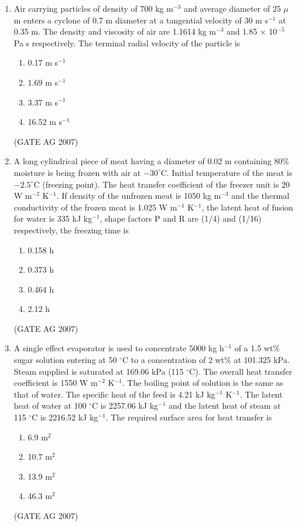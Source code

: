 \documentclass[journal,12pt,onecolumn]{IEEEtran}
\theoremstyle{remark}
\begin{document}
\begin{enumerate}[label=Q\arabic*:]
\item Air carrying particles of density of 700 kg m$^{-3}$ and average diameter of 25 $\mu$m enters a cyclone of 0.7 m diameter at a tangential velocity of 30 m s$^{-1}$ at 0.35 m. The density and viscosity of air are 1.1614 kg m$^{-3}$ and 1.85 $\times$ 10$^{-5}$ Pa s respectively. The terminal radial velocity of the particle is
\begin{multicols}{4}
\begin{enumerate}
    \item 0.17 m s$^{-1}$
    \item 1.69 m s$^{-1}$
    \item 3.37 m s$^{-1}$
    \item 16.52 m s$^{-1}$
\end{enumerate}
\end{multicols}
\hfill(GATE AG 2007)

\item A long cylindrical piece of meat having a diameter of 0.02 m containing 80\% moisture is being frozen with air at $-30^{\circ}$C. Initial temperature of the meat is $-2.5^{\circ}$C (freezing point). The heat transfer coefficient of the freezer unit is 20 W m$^{-2}$ K$^{-1}$. If density of the unfrozen meat is 1050 kg m$^{-3}$ and the thermal conductivity of the frozen meat is 1.025 W m$^{-1}$ K$^{-1}$, the latent heat of fusion for water is 335 kJ kg$^{-1}$, shape factors P and R are (1/4) and (1/16) respectively, the freezing time is
\begin{multicols}{4}
\begin{enumerate}
    \item 0.158 h
    \item 0.373 h
    \item 0.464 h
    \item 2.12 h
\end{enumerate}
\end{multicols}
\hfill(GATE AG 2007)

\item A single effect evaporator is used to concentrate 5000 kg h$^{-1}$ of a 1.5 wt\% sugar solution entering at 50 $^{\circ}$C to a concentration of 2 wt\% at 101.325 kPa. Steam supplied is saturated at 169.06 kPa (115 $^{\circ}$C). The overall heat transfer coefficient is 1550 W m$^{-2}$ K$^{-1}$. The boiling point of solution is the same as that of water. The specific heat of the feed is 4.21 kJ kg$^{-1}$ K$^{-1}$. The latent heat of water at 100 $^{\circ}$C is 2257.06 kJ kg$^{-1}$ and the latent heat of steam at 115 $^{\circ}$C is 2216.52 kJ kg$^{-1}$. The required surface area for heat transfer is
\begin{multicols}{4}
\begin{enumerate}
    \item 6.9 m$^{2}$
    \item 10.7 m$^{2}$
    \item 13.9 m$^{2}$
    \item 46.3 m$^{2}$
\end{enumerate}
\end{multicols}
\hfill(GATE AG 2007)


\end{enumerate}
\end{document}

